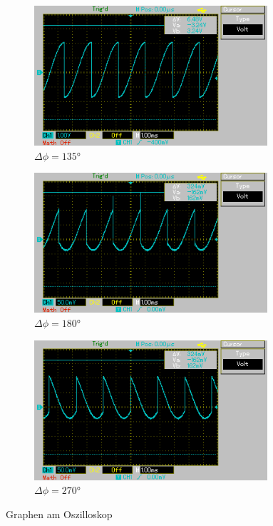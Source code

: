 \begin{figure}
  \begin{subfigure}{0.32\textwidth}
    \centering
    \includegraphics[width=0.95\textwidth]{content/135deg.png}
    \caption{$\Delta\phi = 135°$}
    \label{fig:135-deg}
  \end{subfigure}
  \begin{subfigure}{0.32\textwidth}
    \centering
    \includegraphics[width=0.95\textwidth]{content/180deg.png}
    \caption{$\Delta\phi = 180°$}
    \label{fig:180-deg}
  \end{subfigure}
  \begin{subfigure}{0.32\textwidth}
    \centering
    \includegraphics[width=0.95\textwidth]{content/270deg.png}
    \caption{$\Delta\phi = 270°$}
    \label{fig:270-deg}
  \end{subfigure}
  \caption{Graphen am Oszilloskop}
  \label{fig: graphen}
\end{figure}

